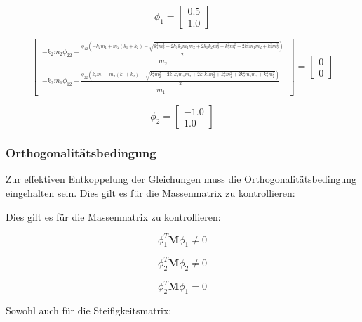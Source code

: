 \documentclass[
  letterpaper,
  DIV=11]{scrreprt}
\begin{document}
\begin{equation*}\phi_{1} = \left[\begin{matrix}0.5\\1.0\end{matrix}\right]\end{equation*}

\begin{equation*}\left[\begin{matrix}\frac{- k_{2} m_{2} \phi_{22} + \frac{\phi_{12} \left(- k_{2} m_{1} + m_{2} \left(k_{1} + k_{2}\right) - \sqrt{k_{1}^{2} m_{2}^{2} - 2 k_{1} k_{2} m_{1} m_{2} + 2 k_{1} k_{2} m_{2}^{2} + k_{2}^{2} m_{1}^{2} + 2 k_{2}^{2} m_{1} m_{2} + k_{2}^{2} m_{2}^{2}}\right)}{2}}{m_{2}}\\\frac{- k_{2} m_{1} \phi_{12} + \frac{\phi_{22} \left(k_{2} m_{1} - m_{2} \left(k_{1} + k_{2}\right) - \sqrt{k_{1}^{2} m_{2}^{2} - 2 k_{1} k_{2} m_{1} m_{2} + 2 k_{1} k_{2} m_{2}^{2} + k_{2}^{2} m_{1}^{2} + 2 k_{2}^{2} m_{1} m_{2} + k_{2}^{2} m_{2}^{2}}\right)}{2}}{m_{1}}\end{matrix}\right] = \left[\begin{matrix}0\\0\end{matrix}\right]\end{equation*}

\begin{equation*}\phi_{2} = \left[\begin{matrix}-1.0\\1.0\end{matrix}\right]\end{equation*}

\hypertarget{orthogonalituxe4tsbedingung-2}{%
\subsubsection{Orthogonalitätsbedingung}\label{orthogonalituxe4tsbedingung-2}}

Zur effektiven Entkoppelung der Gleichungen muss die
Orthogonalitätsbedingung eingehalten sein. Dies gilt es für die
Massenmatrix zu kontrollieren:

Dies gilt es für die Massenmatrix zu kontrollieren:

\[\phi_1^T \mathbf{ M } \phi_1 \neq 0\]

\[\phi_2^T \mathbf{ M } \phi_2 \neq 0\]

\[\phi_2^T \mathbf{ M } \phi_1 = 0\]

Sowohl auch für die Steifigkeitsmatrix:
\end{document}
